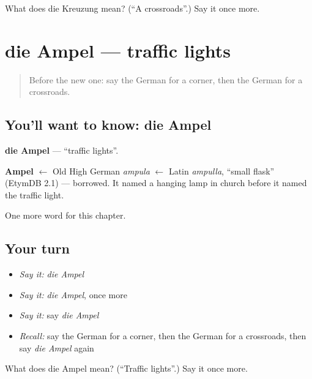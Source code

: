 \begin{tcolorbox}[breakable,colback=teal!4,colframe=teal!35!black,title={Before you move on}]
What does die Kreuzung mean? (\textquotedblleft{}A crossroads\textquotedblright{}.) Say it once more.
\end{tcolorbox}
\section[die Ampel]{die Ampel — traffic lights}

\label{lesson:GE-C107-ampel}



\begin{quote}
Before the new one: say the German for a corner, then the German for a crossroads.
\end{quote}

\subsection*{You'll want to know: die Ampel}
\textbf{die Ampel} — \textquotedblleft{}traffic lights\textquotedblright{}.

\begin{cousinweb}
\textbf{Ampel} $\leftarrow$ Old High German \emph{ampula} $\leftarrow$ Latin \emph{ampulla}, \textquotedblleft{}small flask\textquotedblright{} (EtymDB 2.1) — borrowed. It named a hanging lamp in church before it named the traffic light.
\end{cousinweb}

\begin{grammarlens}[title={What you've built}]
One more word for this chapter.
\end{grammarlens}

\subsection*{Your turn}
\begin{itemize}
\raggedright
  \item \emph{Say it:} \emph{die Ampel}
  \item \emph{Say it:} \emph{die Ampel}, once more
  \item \emph{Say it:} say \emph{die Ampel}
  \item \emph{Recall:} say the German for a corner, then the German for a crossroads, then say \emph{die Ampel} again
\end{itemize}

\begin{tcolorbox}[breakable,colback=teal!4,colframe=teal!35!black,title={Before you move on}]
What does die Ampel mean? (\textquotedblleft{}Traffic lights\textquotedblright{}.) Say it once more.
\end{tcolorbox}

